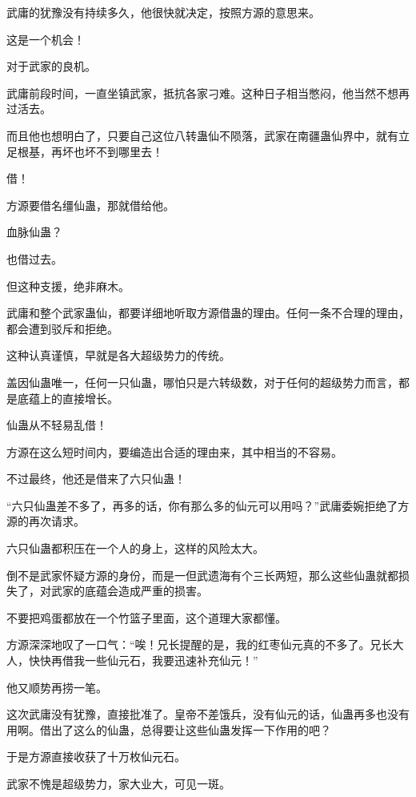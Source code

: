 
\begin{this_body}



武庸的犹豫没有持续多久，他很快就决定，按照方源的意思来。

这是一个机会！

对于武家的良机。

武庸前段时间，一直坐镇武家，抵抗各家刁难。这种日子相当憋闷，他当然不想再过活去。

而且他也想明白了，只要自己这位八转蛊仙不陨落，武家在南疆蛊仙界中，就有立足根基，再坏也坏不到哪里去！

借！

方源要借名缰仙蛊，那就借给他。

血脉仙蛊？

也借过去。

但这种支援，绝非麻木。

武庸和整个武家蛊仙，都要详细地听取方源借蛊的理由。任何一条不合理的理由，都会遭到驳斥和拒绝。

这种认真谨慎，早就是各大超级势力的传统。

盖因仙蛊唯一，任何一只仙蛊，哪怕只是六转级数，对于任何的超级势力而言，都是底蕴上的直接增长。

仙蛊从不轻易乱借！

方源在这么短时间内，要编造出合适的理由来，其中相当的不容易。

不过最终，他还是借来了六只仙蛊！

“六只仙蛊差不多了，再多的话，你有那么多的仙元可以用吗？”武庸委婉拒绝了方源的再次请求。

六只仙蛊都积压在一个人的身上，这样的风险太大。

倒不是武家怀疑方源的身份，而是一但武遗海有个三长两短，那么这些仙蛊就都损失了，对武家的底蕴会造成严重的损害。

不要把鸡蛋都放在一个竹篮子里面，这个道理大家都懂。

方源深深地叹了一口气：“唉！兄长提醒的是，我的红枣仙元真的不多了。兄长大人，快快再借我一些仙元石，我要迅速补充仙元！”

他又顺势再捞一笔。

这次武庸没有犹豫，直接批准了。皇帝不差饿兵，没有仙元的话，仙蛊再多也没有用啊。借出了这么的仙蛊，总得要让这些仙蛊发挥一下作用的吧？

于是方源直接收获了十万枚仙元石。

武家不愧是超级势力，家大业大，可见一斑。


\end{this_body}
